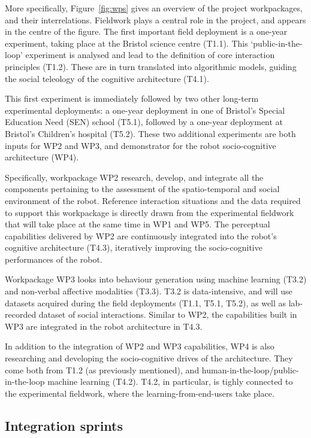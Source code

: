 More specifically, Figure~\ref{fig:wps} gives an overview of the project
workpackages, and their interrelations. Fieldwork plays a central role in the
project, and appears in the centre of the figure. The first important field
deployment is a one-year experiment, taking place at the Bristol science centre
(T1.1). This `public-in-the-loop' experiment is analysed and lead to the
definition of core interaction principles (T1.2). These are in turn translated
into algorithmic models, guiding the social teleology of the cognitive
architecture (T4.1).

This first experiment is immediately followed by two other long-term
experimental deployments: a one-year deployment in one of Bristol's Special
Education Need (SEN) school (T5.1), followed by a one-year deployment at
Bristol's Children's hospital (T5.2). These two additional experiments are both
inputs for WP2 and WP3, and demonstrator for the robot socio-cognitive
architecture (WP4).

Specifically, workpackage WP2 research, develop, and integrate all the components
pertaining to the assessment of the spatio-temporal and social environment of
the robot. Reference interaction situations and the data required to support
this workpackage is directly drawn from the experimental fieldwork that will
take place at the same time in WP1 and WP5. The perceptual capabilities
delivered by WP2 are continuously integrated into the robot's cognitive
architecture (T4.3), iteratively improving the socio-cognitive performances of
the robot.

Workpackage WP3 looks into behaviour generation using machine learning (T3.2)
and non-verbal affective modalities (T3.3). T3.2 is data-intensive, and will use
datasets acquired during the field deployments (T1.1, T5.1, T5.2), as well as
lab-recorded dataset of social interactions. Similar to WP2, the capabilities
built in WP3 are integrated in the robot architecture in T4.3.

In addition to the integration of WP2 and WP3 capabilities, WP4 is also
researching and developing the socio-cognitive drives of the architecture. They
come both from T1.2 (as previously mentioned), and
human-in-the-loop/public-in-the-loop machine learning (T4.2). T4.2, in
particular, is tighly connected to the experimental fieldwork, where the
learning-from-end-users take place.

\subsection{Integration sprints}

